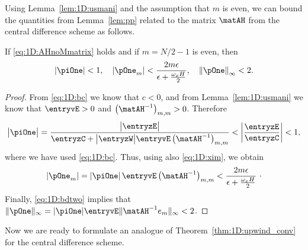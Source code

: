 Using Lemma~\ref{lem:1D:usmani} and the assumption that $m$ is even, we can bound
the quantities from Lemma~\ref{lem:pp} related to the matrix $\matAH$ from the
central difference scheme as follows.

\begin{lemma}\label{lem:pm}
If \eqref{eq:1D:AHnoMmatrix} holds and if $m=N/2-1$ is even, then
%
\begin{equation*}%
\left|\piOne\right|<1,\quad
\left|\pOne_{m}\right|< \frac{2m\epsilon}{\epsilon+\frac{\omega_x H}{2}},\quad
\left\|\pOne\right\|_\infty<2.
\end{equation*}
%
\end{lemma}

\begin{proof}
From \eqref{eq:1D:bc} we know that $c<0$, and from Lemma~\ref{lem:1D:usmani} we know
that $\entryvE>0$ and $\left(\matAH^{-1}\right)_{m,m}>0$. Therefore
%
$$\bigl|\piOne\bigr|=
\frac{\bigl|\entryzE\bigr|}{\entryzC+\bigl|\entryzW\bigr|\entryvE\left(\matAH^{-1}\right)_{m,m}}<
\left|\frac{\entryzE}{\entryzC}\right|<1,$$
%
where we have used \eqref{eq:1D:bc}. Thus, using also \eqref{eq:1D:xim}, we obtain
%
$$\left|\pOne_{m}\right|=|\piOne|\,\entryvE\left(\matAH^{-1}\right)_{m,m}<
\frac{2m\epsilon}{\epsilon+\frac{\omega_x H}{2}} ~\cdot$$
%
Finally, \eqref{eq:1D:bdtwo} implies that
$\| \pOne\|_\infty = |\piOne| \entryvE \|\matAH^{-1}e_m\|_\infty <2$.
%
\end{proof}

Now we are ready to formulate an analogue of Theorem~\ref{thm:1D:upwind_conv}
for the central difference scheme.

